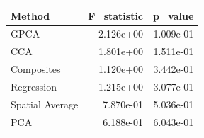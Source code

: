 \begin{tabular}{lrr}
\toprule
Method & F_statistic & p_value \\
\midrule
GPCA & 2.126e+00 & 1.009e-01 \\
CCA & 1.801e+00 & 1.511e-01 \\
Composites & 1.120e+00 & 3.442e-01 \\
Regression & 1.215e+00 & 3.077e-01 \\
Spatial Average & 7.870e-01 & 5.036e-01 \\
PCA & 6.188e-01 & 6.043e-01 \\
\bottomrule
\end{tabular}
